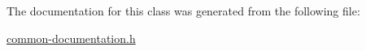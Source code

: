 The documentation for this class was generated from the following file\+:\begin{DoxyCompactItemize}
\item 
\hyperlink{common-documentation_8h}{common-\/documentation.\+h}\end{DoxyCompactItemize}
